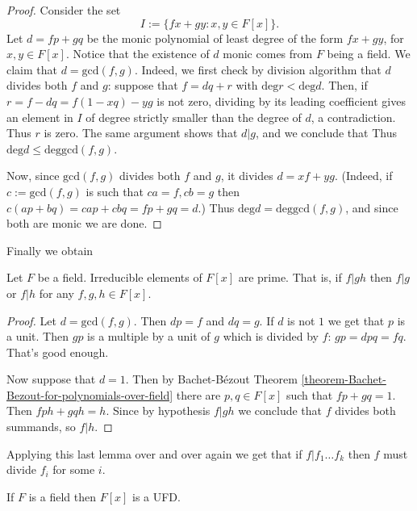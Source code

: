\begin{proof}
Consider the set
$$
I:=\{fx+gy:x,y \in F[x]\}.
$$
Let $d=fp+gq$ be the monic polynomial of least degree 
of the form $fx+gy$, for $x,y \in F[x]$.
Notice that the existence of $d$ monic comes from $F$ being a field.
We claim that $d=\text{gcd}(f,g)$. 
Indeed, we first check by division algorithm
that $d$ divides both $f$ and $g$: 
suppose that $f=dq+r$ with $\text{deg}r<\text{deg}d$. 
Then, if $r=f-dq=f(1-xq)-yg$ is not zero, 
dividing by its leading coefficient gives an element in $I$ 
of degree strictly smaller than the degree of $d$, a contradiction.
Thus $r$ is zero. The same argument shows that $d|g$, and we conclude that
Thus $\text{deg}d \leq \text{deg}\text{gcd}(f,g)$. 

Now, since
$\text{gcd}(f,g)$ divides both $f$ and $g$, it divides $d=xf+yg$. (Indeed, if
$c:=\text{gcd}(f,g)$ is such that $ca=f,cb=g$ then $c(ap+bq)=cap+cbq=fp+gq=d$.) 
Thus $\text{deg}d=\text{deg}\text{gcd}(f,g)$, and since both are monic we are
done.
\end{proof}

Finally we obtain

\begin{lemma}
\label{lemma-irreducible-is-prime-in-F[x]}
Let $F$ be a field. Irreducible elements of $F[x]$ are prime. That is, if $f|gh$
then $f|g$ or $f|h$ for any $f,g,h \in F[x]$.
\end{lemma}

\begin{proof}
Let $d=\text{gcd}(f,g)$. Then $dp=f$ and $dq=g$. If $d$ is not $1$ 
we get that $p$ is a unit. Then $gp$ is a multiple by a unit of $g$ which is
divided by $f$: $gp=dpq=fq$. That's good enough.

Now suppose that $d=1$. Then by Bachet-Bézout Theorem
\ref{theorem-Bachet-Bezout-for-polynomials-over-field} 
there are $p,q \in F[x]$ such that $fp+gq=1$. Then $fph+gqh=h$. Since by
hypothesis $f|gh$ we conclude that $f$ divides both summands, so $f|h$.
\end{proof}

Applying this last lemma over and over again we get that if $f|f_1\ldots f_k$
then $f$ must divide $f_i$ for some $i$.

\begin{lemma}
\label{lemma-polynomials-over-fields-are-UFD}
If $F$ is a field then $F[x]$ is a UFD.
\end{lemma}

